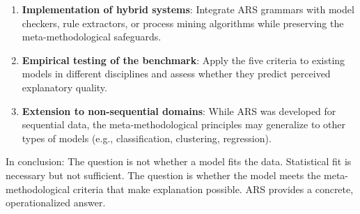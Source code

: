 \documentclass[12pt,a4paper]{article}
\begin{document}
\begin{enumerate}
    \item \textbf{Implementation of hybrid systems}: Integrate ARS 
    grammars with model checkers, rule extractors, or process mining 
    algorithms while preserving the meta-methodological safeguards.
    
    \item \textbf{Empirical testing of the benchmark}: Apply the five 
    criteria to existing models in different disciplines and assess 
    whether they predict perceived explanatory quality.
    
    \item \textbf{Extension to non-sequential domains}: While ARS was 
    developed for sequential data, the meta-methodological principles 
    may generalize to other types of models (e.g., classification, 
    clustering, regression).
\end{enumerate}

In conclusion: The question is not whether a model fits the data. 
Statistical fit is necessary but not sufficient. The question is whether 
the model meets the meta-methodological criteria that make explanation 
possible. ARS provides a concrete, operationalized answer.
\end{document}
